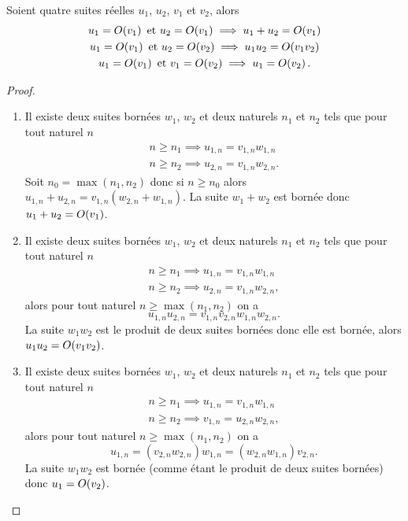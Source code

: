 \begin{prop}
  Soient quatre suites réelles \(u_1\), \(u_2\), \(v_1\) et \(v_2\), alors
  \begin{gather}
  u_1=O\mathopen{}\left(v_1\right) \text{~et~} u_2=O\mathopen{}\left(v_1\right) \implies u_1+u_2=O\mathopen{}\left(v_1\right)\\
  u_1=O\mathopen{}\left(v_1\right) \text{~et~} u_2=O\mathopen{}\left(v_2\right) \implies u_1u_2=O\mathopen{}\left(v_1 v_2\right)\\
  u_1=O\mathopen{}\left(v_1\right) \text{~et~} v_1=O\mathopen{}\left(v_2\right) \implies u_1=O\mathopen{}\left(v_2\right).
  \end{gather}
\end{prop}
\begin{proof}
  \begin{enumerate}
  \item Il existe deux suites bornées \(w_1\), \(w_2\) et deux naturels \(n_1\) et \(n_2\) tels que pour tout naturel \(n\)
    \begin{align}
      n \geqslant n_1 \implies u_{1,n}=v_{1,n}w_{1,n} \\
      n \geqslant n_2 \implies u_{2,n}=v_{1,n}w_{2,n}.
    \end{align}
    Soit \(n_0=\max(n_1,n_2)\) donc si \(n \geqslant n_0\) alors \(u_{1,n} + u_{2,n}= v_{1,n} (w_{2,n}+w_{1,n})\). La suite \(w_{1} + w_{2}\) est bornée donc \(u_1+u_2=O\mathopen{}\left(v_1\right)\).
  \item Il existe deux suites bornées \(w_1\), \(w_2\) et deux naturels \(n_1\) et \(n_2\) tels que pour tout naturel \(n\)
    \begin{align}
      n \geqslant n_1 \implies u_{1,n}=v_{1,n}w_{1,n} \\
      n \geqslant n_2 \implies u_{2,n}=v_{1,n}w_{2,n},
    \end{align}
    alors pour tout naturel \(n \geqslant \max(n_1,n_2)\) on a
    \begin{equation}
      u_{1,n} u_{2,n} = v_{1,n} v_{2,n} w_{1,n} w_{2,n}.
    \end{equation}
    La suite \(w_1 w_2\) est le produit de deux suites bornées donc elle est bornée, alors \(u_1u_2=O\mathopen{}\left(v_1v_2\right)\).
  \item Il existe deux suites bornées \(w_1\), \(w_2\) et deux naturels \(n_1\) et \(n_2\) tels que pour tout naturel \(n\) 
    \begin{align}
      n \geqslant n_1 \implies u_{1,n}=v_{1,n}w_{1,n} \\
      n \geqslant n_2 \implies v_{1,n}=u_{2,n}w_{2,n}, 
    \end{align}
    alors pour tout naturel \(n \geqslant \max(n_1,n_2)\) on a
    \begin{equation}
      u_{1,n}=(v_{2,n} w_{2,n})w_{1,n}=(w_{2,n} w_{1,n}) v_{2,n}.
    \end{equation}
    La suite \(w_1 w_2\) est bornée (comme étant le produit de deux suites bornées) donc \(u_1=O\mathopen{}\left(v_2\right)\).
  \end{enumerate}
\end{proof}

